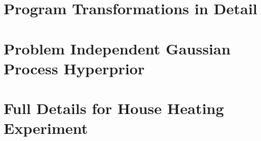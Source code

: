 

\newpage


\section{Program Transformations in Detail}
\label{sec:program-transformations}



\section{Problem Independent Gaussian Process Hyperprior}
\label{sec:app:hyperprior}



\section{Full Details for House Heating Experiment}
\label{sec:app:heating}


